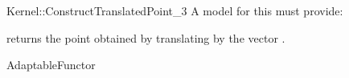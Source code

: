 \begin{ccRefFunctionObjectConcept}{Kernel::ConstructTranslatedPoint_3}
A model for this must provide:


       {returns the point obtained by translating  by the vector 
        .}

\ccRefines
AdaptableFunctor

\ccSeeAlso
{} \\

\end{ccRefFunctionObjectConcept}
